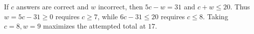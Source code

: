 If $c$ answers are correct and $w$ incorrect, then $5c-w=31$ and $c+w\le20$. Thus $w=5c-31\ge0$ requires $c\ge7$, while $6c-31\le20$ requires $c\le8$. Taking $c=8,w=9$ maximizes the attempted total at $\boxed{17}$.
